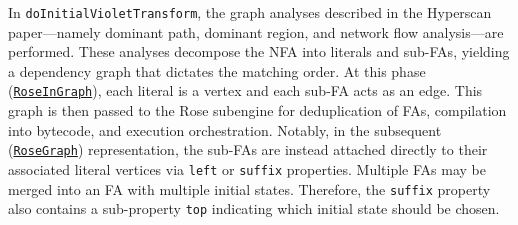 In \texttt{doInitialVioletTransform}, the graph analyses described in the Hyperscan paper---namely dominant path, dominant region, and network flow analysis---are performed. These analyses decompose the NFA into literals and sub-FAs, yielding a dependency graph that dictates the matching order. At this phase (\href{https://github.com/intel/hyperscan/blob/master/src/rose/rose_in_graph.h#L189}{\texttt{RoseInGraph}}), each literal is a vertex and each sub-FA acts as an edge. This graph is then passed to the Rose subengine for deduplication of FAs, compilation into bytecode, and execution orchestration. Notably, in the subsequent (\href{https://github.com/intel/hyperscan/blob/master/src/rose/rose_graph.h#L222}{\texttt{RoseGraph}}) representation, the sub-FAs are instead attached directly to their associated literal vertices via \texttt{left} or \texttt{suffix} properties. Multiple FAs may be merged into an FA with multiple initial states. Therefore, the \texttt{suffix} property also contains a sub-property \texttt{top} indicating which initial state should be chosen.


